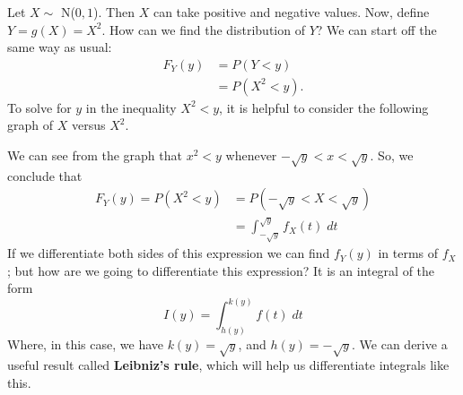 \noindent Let $X \sim$ N($0,1$). Then $X$ can take positive and negative values. Now, define $Y = g(X) = X^2$. How can we find the distribution of $Y$? We can start off the same way as usual:
\begin{align*}
F_Y(y) & = P(Y < y) \\
	& = P(X^2 < y).
\end{align*}
To solve for $y$ in the inequality $X^2 < y$, it is helpful to consider the following graph of $X$ versus $X^2$.
\begin{center}
\end{center}
We can see from the graph that $x^2 < y$ whenever $-\sqrt{y} < x < \sqrt{y}$. So, we conclude that
\begin{align*}
F_Y(y) = P(X^2 < y) & = P(-\sqrt{y} < X < \sqrt{y}) \\
	& = \int_{-\sqrt{y}}^{\sqrt{y}} f_X(t) \; dt \tag{definition of probability for pdfs}
\end{align*}
If we differentiate both sides of this expression we can find $f_Y(y)$ in terms of $f_X$; but how are we going to differentiate this expression? It is an integral of the form
\[
I(y) = \int_{h(y)}^{k(y)} f(t) \; dt
\]
Where, in this case, we have $k(y) = \sqrt{y}$, and $h(y) = -\sqrt{y}$. We can derive a useful result called \textbf{Leibniz's rule}, which will help us differentiate integrals like this.
